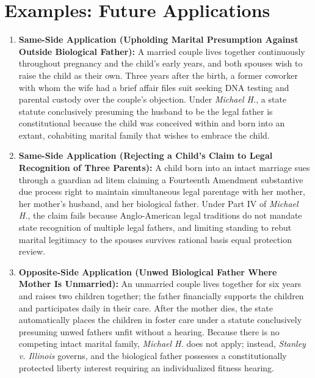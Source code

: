 \documentclass[12pt]{article}
\begin{document}
\section{Examples: Future Applications}

\begin{enumerate}
\item \textbf{Same-Side Application (Upholding Marital Presumption Against Outside Biological Father):} A married couple lives together continuously throughout pregnancy and the child's early years, and both spouses wish to raise the child as their own. Three years after the birth, a former coworker with whom the wife had a brief affair files suit seeking DNA testing and parental custody over the couple's objection. Under \textit{Michael H.}, a state statute conclusively presuming the husband to be the legal father is constitutional because the child was conceived within and born into an extant, cohabiting marital family that wishes to embrace the child.

\item \textbf{Same-Side Application (Rejecting a Child's Claim to Legal Recognition of Three Parents):} A child born into an intact marriage sues through a guardian ad litem claiming a Fourteenth Amendment substantive due process right to maintain simultaneous legal parentage with her mother, her mother's husband, and her biological father. Under Part IV of \textit{Michael H.}, the claim fails because Anglo-American legal traditions do not mandate state recognition of multiple legal fathers, and limiting standing to rebut marital legitimacy to the spouses survives rational basis equal protection review.

\item \textbf{Opposite-Side Application (Unwed Biological Father Where Mother Is Unmarried):} An unmarried couple lives together for six years and raises two children together; the father financially supports the children and participates daily in their care. After the mother dies, the state automatically places the children in foster care under a statute conclusively presuming unwed fathers unfit without a hearing. Because there is no competing intact marital family, \textit{Michael H.} does not apply; instead, \textit{Stanley v. Illinois} governs, and the biological father possesses a constitutionally protected liberty interest requiring an individualized fitness hearing.


\end{enumerate}
\end{document}
